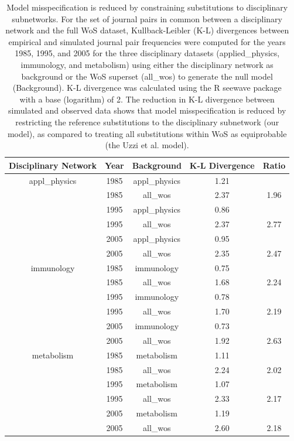 \documentclass[NETN]{stjour}
\begin{document}
\begin{table}[ht]
\caption{Model misspecification is reduced by constraining substitutions to disciplinary subnetworks. For the set of journal pairs in common between a disciplinary network and the full WoS dataset, Kullback-Leibler (K-L) divergences
between empirical and simulated journal pair frequencies were computed for the years 1985, 1995, and 2005 for the three disciplinary datasets (applied\_physics, immunology, and metabolism) using either the disciplinary network as background or the WoS superset (all\_wos) to generate the null model (Background). K-L divergence was calculated using the R seewave package \citep{seewave2008} with a base (logarithm) of 2. 
The reduction in K-L divergence between simulated and observed data  shows that model misspecification is reduced by  restricting the reference substitutions to the disciplinary subnetwork (our model), as compared to treating all substitutions within WoS as equiprobable (the Uzzi et al. model).
}
\label{tab:kld}
\centering
\begin{tabular}{| ccccc |} 
  \hline
 Disciplinary Network & Year & Background & K-L Divergence & Ratio \\ 
  \hline
 appl\_physics & 1985 & appl\_physics & 1.21 &  \\ 
  & 1985 & all\_wos & 2.37 & 1.96 \\ 
  & 1995 & appl\_physics & 0.86 &  \\ 
  & 1995 & all\_wos & 2.37 & 2.77 \\ 
  & 2005 & appl\_physics & 0.95 &  \\ 
  & 2005 & all\_wos & 2.35 & 2.47 \\ 
    \hline
  immunology & 1985 & immunology & 0.75 &  \\ 
  & 1985 & all\_wos & 1.68 & 2.24 \\ 
   & 1995 & immunology & 0.78 &  \\ 
   & 1995 & all\_wos & 1.70 & 2.19 \\ 
   & 2005 & immunology & 0.73 &  \\ 
  & 2005 & all\_wos & 1.92 & 2.63 \\ 
    \hline
 metabolism & 1985 & metabolism & 1.11 &  \\ 
   & 1985 & all\_wos & 2.24 & 2.02 \\ 
  & 1995 & metabolism & 1.07 &  \\ 
  & 1995 & all\_wos & 2.33 & 2.17 \\ 
     & 2005 & metabolism & 1.19 &  \\ 
   & 2005 & all\_wos & 2.60 & 2.18 \\ 
   \hline
\end{tabular}
\end{table}
\end{document}
